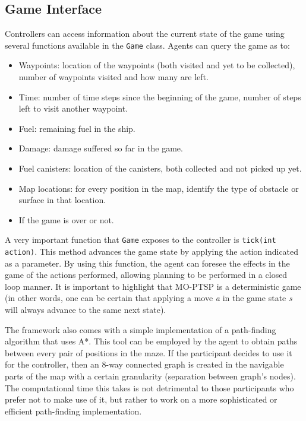\documentclass[conference]{IEEEtran}
\newcommand{\code}[1]{{\lstinline!#1!}}
\begin{document}

\subsection{Game Interface} \label{ssec:cont}

Controllers can access information about the current state of the game using several functions available in the \code{Game} class. Agents can query the game as to:

\begin{itemize}
\item Waypoints: location of the waypoints (both visited and yet to be collected), number of waypoints visited and how many are left.
\item Time: number of time steps since the beginning of the game, number of steps left to visit another waypoint.
\item Fuel: remaining fuel in the ship.
\item Damage: damage suffered so far in the game.
\item Fuel canisters: location of the canisters, both collected and not picked up yet.
\item Map locations: for every position in the map, identify the type of obstacle or surface in that location.
\item If the game is over or not.
\end{itemize}

A very important function that \code{Game} exposes to the controller is \code{tick(int action)}. This method advances the game state by applying the action indicated as a parameter. By using this function, the agent can foresee the effects in the game of the actions performed, allowing planning to be performed in a closed loop manner. It is important to highlight that MO-PTSP is a deterministic game (in other words, one can be certain that applying a move \textit{a} in the game state \textit{s} will always advance to the same next state).

The framework also comes with a simple implementation of a path-finding algorithm that uses A*. This tool can be employed by the agent to obtain paths between every pair of positions in the maze. If the participant decides to use it for the controller, then an 8-way connected graph is created in the navigable parts of the map with a certain granularity (separation between graph's nodes). The computational time this takes is not detrimental to those participants who prefer not to make use of it, but rather to work on a more sophisticated or efficient path-finding implementation.
\end{document}
